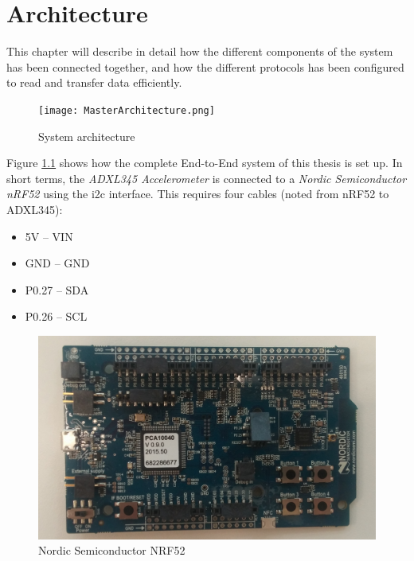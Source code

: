 \chapter{Architecture}
\label{chp:architecture} 

This chapter will describe in detail how the different components of the system has been connected together, and how the different protocols has been configured to read and transfer data efficiently. 


\begin{figure}[h]
    \centering
    \texttt{[image: MasterArchitecture.png]}    \caption{System architecture}
    \label{fig:systemArchitecture}
\end{figure}

\newpage

Figure \ref{fig:systemArchitecture} shows how the complete End-to-End system of this thesis is set up. In short terms, the \textit{ADXL345 Accelerometer} is connected to a \textit{Nordic Semiconductor nRF52} using the \gls{i2c} interface. This requires four cables (noted from nRF52 to ADXL345): 

\begin{itemize}
  \item 5V -- VIN 
  \item GND -- GND 
  \item P0.27 -- SDA
  \item P0.26 -- SCL
\end{itemize} 


\begin{figure}[h]
    \centering
    \includegraphics[scale=0.32]{nrf52.png}    \caption{Nordic Semiconductor NRF52}
    \label{fig:adxl345}
\end{figure}

